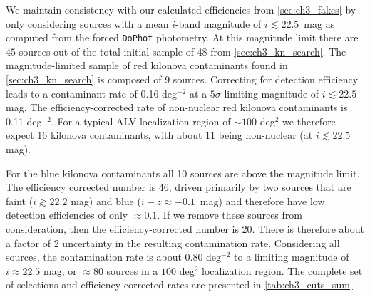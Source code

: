 We maintain consistency with our calculated efficiencies from \cref{sec:ch3_fakes} by only considering sources with a mean $i$-band magnitude of $i \lesssim 22.5$~mag as computed from the forced {\tt DoPhot} photometry. At this magnitude limit there are $45$ sources out of the total initial sample of $48$ from \cref{sec:ch3_kn_search}. The magnitude-limited sample of red kilonova contaminants found in \cref{sec:ch3_kn_search} is composed of 9 sources. Correcting for detection efficiency leads to a contaminant rate of 0.16 deg$^{-2}$ at a $5\sigma$ limiting magnitude of $i \lesssim 22.5$ mag. The efficiency-corrected rate of non-nuclear red kilonova contaminants is 0.11 deg$^{-2}$.  For a typical ALV localization region of $\sim 100$ deg$^2$ we therefore expect 16 kilonova contaminants, with about 11 being non-nuclear (at $i\lesssim 22.5$ mag).

For the blue kilonova contaminants all 10 sources are above the magnitude limit. The efficiency corrected number is 46, driven primarily by two sources that are faint ($i \gtrsim 22.2$ mag) and blue ($i-z \approx -0.1$~mag) and therefore have low detection efficiencies of only $\approx 0.1$. If we remove these sources from consideration, then the efficiency-corrected number is 20. There is therefore about a factor of 2 uncertainty in the resulting contamination rate. Considering all sources, the contamination rate is about 0.80 deg$^{-2}$ to a limiting magnitude of $i\approx 22.5$ mag, or $\approx 80$ sources in a $100$ deg$^2$ localization region. The complete set of selections and efficiency-corrected rates are presented in \cref{tab:ch3_cuts_sum}.

